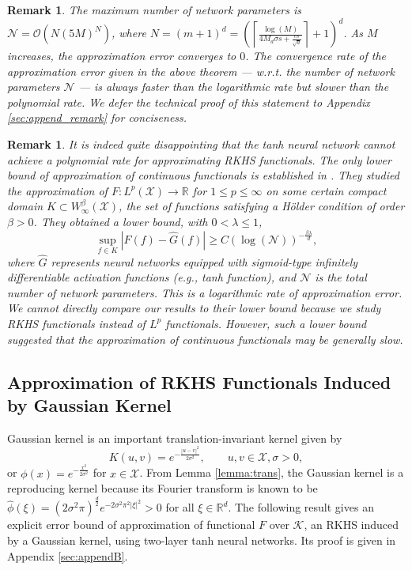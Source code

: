 \documentclass{article}
\def\RR{\mathbb R}
\numberwithin{equation}{section}
\newtheorem{remark}[theorem]{Remark}
\begin{document}
\begin{remark}\label{remark:rate_thm1}
The maximum number of network parameters is $\mathcal{N} = \mathcal{O}\left(N(5M)^N\right)$, where $N = (m+1)^d = \left(\left\lceil\frac{\log (M)}{4M_d\sigma s + \frac{cs}{\sqrt{d}}}\right\rceil +1\right)^d$.
As $M$ increases, the approximation error converges to $0$. 
The convergence rate of the approximation error given in the above theorem --- w.r.t. the number of network parameters $\mathcal{N}$ --- is always faster than the logarithmic rate but slower than the polynomial rate. 
We defer the technical proof of this statement to Appendix \ref{sec:append_remark} for conciseness. 
\end{remark}

\begin{remark}
It is indeed quite disappointing that the tanh neural network cannot achieve a polynomial rate for approximating RKHS functionals.
The only lower bound of approximation of continuous functionals is established in \citep[Theorem 2.2]{mhaskar1997neural}. They studied the approximation of $F: L^p (\mathcal{X}) \rightarrow \RR$ for $1 \leq p \leq \infty$ on some certain compact domain $K \subset W^\beta_\infty (\mathcal{X})$, the set of functions satisfying
a Hölder condition of order $\beta >0$. They obtained a lower bound, with $0 < \lambda \leq 1$, 
$$\sup_{f\in K}\left|F(f) - \widehat{G}(f)\right|\geq C(\log (\mathcal N))^{-\frac{\beta \lambda}{d}},$$ where $\widehat{G}$ represents neural networks equipped with sigmoid-type infinitely differentiable activation functions (e.g., tanh function), and $\mathcal{N}$ is the total number of network parameters. 
This is a logarithmic rate of approximation error. 
We cannot directly compare our results to their lower bound because we study  RKHS functionals instead of $L^p$ functionals. 
However, such a lower bound suggested that the approximation of continuous functionals may be generally slow.  
\end{remark}

\subsection{Approximation of RKHS Functionals Induced by Gaussian Kernel}
Gaussian kernel is an important translation-invariant kernel given by
\begin{equation}\label{Gaussian}
    K(u,v)= e^{-\frac{|u-v|^2}{2\sigma^2}}, \qquad u,v \in \mathcal{X}, \sigma >0,
\end{equation}
or $\phi(x) = e^{-\frac{x^2}{2\sigma^2}}$ for $x\in\mathcal{X}$. 
From Lemma \ref{lemma:trans}, the Gaussian kernel is a reproducing kernel because its Fourier transform is known to be $\widehat{\phi}(\xi) = (2\sigma^2\pi)^{\frac{d}{2}}e^{-2\sigma^2\pi^2 |\xi|^2}> 0$ for all $\xi \in \RR^d$. 
The following result gives an explicit error bound of approximation of functional $F$ over $\mathcal{K}$, an RKHS induced by a Gaussian kernel, using two-layer tanh neural networks. Its proof is given in Appendix \ref{sec:appendB}. 
\end{document}
